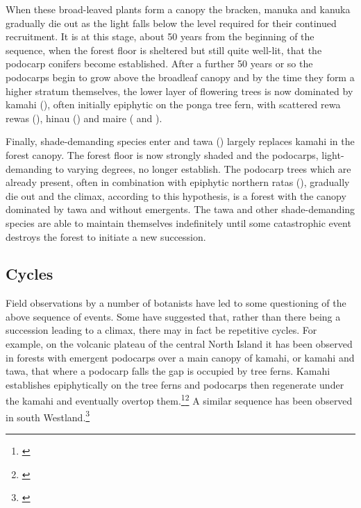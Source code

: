 When these broad-leaved plants form a canopy the bracken, manuka and kanuka gradually die out as the light falls below the level required for their continued recruitment.
It is at this stage, about 50 years from the beginning of the sequence, when the forest floor is sheltered but still quite well-lit, that the podocarp conifers become established.
After a further 50 years or so the podocarps begin to grow above the broadleaf canopy and by the time they form a higher stratum themselves, the lower layer of flowering trees is now dominated by kamahi (), often initially epiphytic on the ponga tree fern, with scattered rewa rewas (), hinau () and maire ( and ).

Finally, shade-demanding species enter and tawa () largely replaces kamahi in the forest canopy.
The forest floor is now strongly shaded and the podocarps, light-demanding to varying degrees, no longer establish.
The podocarp trees which are already present, often in combination with epiphytic northern ratas (), gradually die out and the climax, according to this hypothesis, is a forest with the canopy dominated by tawa and without emergents.
The tawa and other shade-demanding species are able to maintain themselves indefinitely until some catastrophic event destroys the forest to initiate a new succession.

\subsection[Cycles]{Cycles }

Field observations by a number of botanists have led to some questioning of the above sequence of events.
Some have suggested that, rather than there being a succession leading to a climax, there may in fact be repetitive cycles.
For example, on the volcanic plateau of the central North Island it has been observed in forests with emergent podocarps over a main canopy of kamahi, or kamahi and tawa, that where a podocarp falls the gap is occupied by tree ferns.
Kamahi establishes epiphytically on the tree ferns and podocarps then regenerate under the kamahi and eventually overtop them.\footnote{\cite{cameron1955mosaic}}\footnote{\cite{beveridge1973regeneration}} A similar sequence has been observed in south Westland.\footnote{\cite{poole1937survey}}

